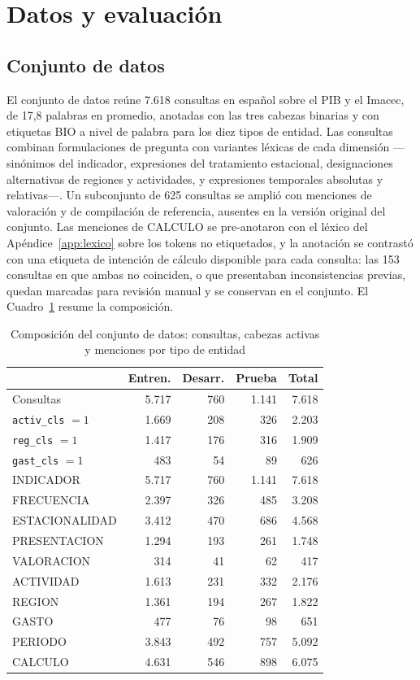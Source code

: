 \documentclass[11pt]{article}
\begin{document}
\section{Datos y evaluación}
\label{sec:evaluacion}

\subsection{Conjunto de datos}

El conjunto de datos reúne 7.618 consultas en español sobre el PIB y el Imacec,
de 17,8 palabras en promedio, anotadas con las tres cabezas binarias y con
etiquetas BIO a nivel de palabra para los diez tipos de entidad. Las consultas
combinan formulaciones de pregunta con variantes léxicas de cada dimensión
---sinónimos del indicador, expresiones del tratamiento estacional, designaciones
alternativas de regiones y actividades, y expresiones temporales absolutas y
relativas---. Un subconjunto de 625 consultas se amplió con menciones de
valoración y de compilación de referencia, ausentes en la versión original del
conjunto. Las menciones de CALCULO se pre-anotaron con el léxico del
Apéndice~\ref{app:lexico} sobre los tokens no etiquetados, y la anotación se
contrastó con una etiqueta de intención de cálculo disponible para cada consulta:
las 153 consultas en que ambas no coinciden, o que presentaban inconsistencias
previas, quedan marcadas para revisión manual y se conservan en el conjunto. El
Cuadro~\ref{tab:datos} resume la composición.

\begin{table}[htbp]
\centering
\caption{Composición del conjunto de datos: consultas, cabezas activas y menciones por tipo de entidad}
\label{tab:datos}
\small
\begin{tabular}{l rrr r}
\toprule
& Entren. & Desarr. & Prueba & Total \\
\midrule
Consultas & 5.717 & 760 & 1.141 & 7.618 \\
\addlinespace[2pt]
\texttt{activ\_cls} $=1$ & 1.669 & 208 & 326 & 2.203 \\
\texttt{reg\_cls} $=1$ & 1.417 & 176 & 316 & 1.909 \\
\texttt{gast\_cls} $=1$ & 483 & 54 & 89 & 626 \\
\addlinespace[2pt]
INDICADOR & 5.717 & 760 & 1.141 & 7.618 \\
FRECUENCIA & 2.397 & 326 & 485 & 3.208 \\
ESTACIONALIDAD & 3.412 & 470 & 686 & 4.568 \\
PRESENTACION & 1.294 & 193 & 261 & 1.748 \\
VALORACION & 314 & 41 & 62 & 417 \\
ACTIVIDAD & 1.613 & 231 & 332 & 2.176 \\
REGION & 1.361 & 194 & 267 & 1.822 \\
GASTO & 477 & 76 & 98 & 651 \\
PERIODO & 3.843 & 492 & 757 & 5.092 \\
CALCULO & 4.631 & 546 & 898 & 6.075 \\
\bottomrule
\end{tabular}
\end{table}
\end{document}
